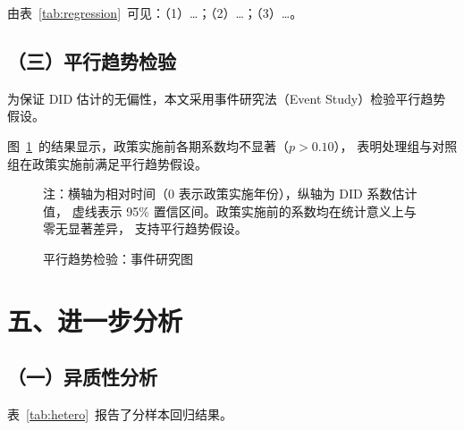 \documentclass[lang=cn, aaffiliation={中国}]{ctexart}
\begin{document}
由表~\ref{tab:regression}~可见：（1）\dots；（2）\dots；（3）\dots。

\subsection{（三）平行趋势检验}
\label{sec:parallel}

为保证 DID 估计的无偏性，本文采用事件研究法（Event Study）检验平行趋势假设。

图~\ref{fig:parallel}~的结果显示，政策实施前各期系数均不显著（$p>0.10$），
表明处理组与对照组在政策实施前满足平行趋势假设。

\begin{figure}[htbp]
    \centering
    \caption{平行趋势检验：事件研究图}
    \label{fig:parallel}
    \begin{minipage}{0.9\textwidth}\footnotesize
        注：横轴为相对时间（0 表示政策实施年份），纵轴为 DID 系数估计值，
        虚线表示 95\% 置信区间。政策实施前的系数均在统计意义上与零无显著差异，
        支持平行趋势假设。
    \end{minipage}
\end{figure}

\section{五、进一步分析}
\label{sec:additional}

\subsection{（一）异质性分析}
\label{sec:hetero}

表~\ref{tab:hetero}~报告了分样本回归结果。
\end{document}
